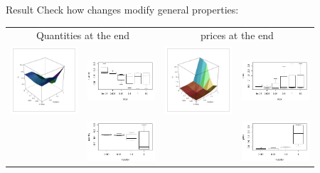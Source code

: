 \documentclass[12pt, notes=show]{beamer}
\begin{document}
\begin{frame}{Result}
    Check how changes modify general properties:
    \begin{table}
	\centering
	\begin{tabular}{c m{2.5cm}c m{2.5cm}}
	    \multicolumn{2}{c}{\vspace{-1cm}\tiny Quantities at the end} &\multicolumn{2}{c}{\tiny prices at the end}\\
	    \multirow{1}{2.5cm}{\includegraphics[height=2.5cm]{../images/QuantitieMuCopyAll.pdf}} &
	    \vspace{1cm}   \includegraphics[height=1.5cm]{../images/QuantitieCopyAll.pdf}&
	    \multirow{1}{2.5cm}{\includegraphics[height=2.5cm]{../images/PriceMuCopyAll.pdf}} &
	    \vspace{1cm} \includegraphics[height=1.5cm]{../images/PriceCopyAll.pdf} \\
	    &	\includegraphics[height=1.5cm]{../images/QuantitieMuAll.pdf}&	&\includegraphics[height=1.5cm]{../images/PriceMuAll.pdf}\\
	\end{tabular}
    \end{table}
   

\end{frame}
\end{document}
